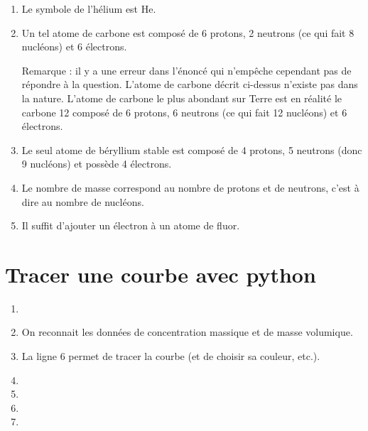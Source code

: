 \documentclass[12pt,a4paper]{article}
\begin{document}
\begin{enumerate}
\item Le symbole de l'hélium est He.

\item Un tel atome de carbone est composé de 6 protons, 2 neutrons (ce qui fait 8 nucléons) et 6 électrons.

Remarque : il y a une erreur dans l'énoncé qui n'empêche cependant pas de répondre à la question.
L'atome de carbone décrit ci-dessus n'existe pas dans la nature.
L'atome de carbone le plus abondant sur Terre est en réalité le carbone 12 composé de 6 protons, 6 neutrons (ce qui fait 12 nucléons) et 6 électrons.

\item Le seul atome de béryllium stable est composé de 4 protons, 5 neutrons (donc 9 nucléons) et possède 4 électrons.

\item Le nombre de masse correspond au nombre de protons et de neutrons, c'est à dire au nombre de nucléons.

\item Il suffit d'ajouter un électron à un atome de fluor.
\end{enumerate}

\section*{Tracer une courbe avec python\texttrademark{}}



\begin{enumerate}
\item

\item On reconnait les données de concentration massique et de masse volumique.

\item La ligne 6 permet de tracer la courbe (et de choisir sa couleur, etc.).

\item

\item 

\item 

\item
\end{enumerate}
\end{document}
